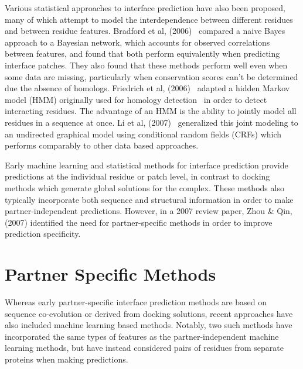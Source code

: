 Various statistical approaches to interface prediction have also been proposed, many of which attempt to model the interdependence between different residues and between residue features.
Bradford et al, (2006)~\cite{bradford2006} compared a naive Bayes approach to a Bayesian network, which accounts for observed correlations between features, and found that both perform equivalently when predicting interface patches.
They also found that these methods perform well even when some data are missing, particularly when conservation scores can't be determined due the absence of homologs.
Friedrich et al, (2006)~\cite{friedrich2006} adapted a hidden Markov model (HMM) originally used for homology detection~\cite{eddy1998} in order to detect interacting residues.
The advantage of an HMM is the ability to jointly model all residues in a sequence at once.
Li et al, (2007)~\cite{li2007} generalized this joint modeling to an undirected graphical model using conditional random fields (CRFs) which performs comparably to other data based approaches.

Early machine learning and statistical methods for interface prediction provide predictions at the individual residue or patch level, in contrast to docking methods which generate global solutions for the complex.
These methods also typically incorporate both sequence and structural information in order to make partner-independent predictions.
However, in a 2007 review paper, Zhou \& Qin, (2007)\cite{zhou2007} identified the need for partner-specific methods in order to improve prediction specificity.


\section{Partner Specific Methods}

Whereas early partner-specific interface prediction methods are based on sequence co-evolution or derived from docking solutions, recent approaches have also included machine learning based methods.
Notably, two such methods have incorporated the same types of features as the partner-independent machine learning methods, but have instead considered pairs of residues from separate proteins when making predictions. 

